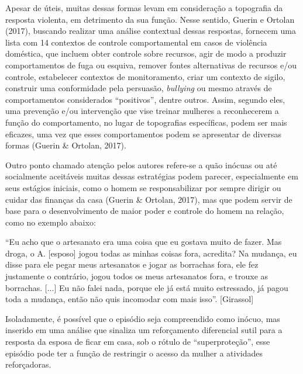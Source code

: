 Apesar de úteis, muitas dessas formas levam em consideração a topografia da resposta violenta, em detrimento da sua função. Nesse sentido, Guerin e Ortolan (2017), buscando realizar uma análise contextual dessas respostas, fornecem uma lista com 14 contextos de controle comportamental em casos de violência doméstica, que incluem obter controle sobre recursos, agir de modo a produzir comportamentos de fuga ou esquiva, remover fontes alternativas de recursos e/ou controle, estabelecer contextos de monitoramento, criar um contexto de sigilo, construir uma conformidade pela persuasão, \textit{bullying} ou mesmo através de comportamentos considerados ``positivos'', dentre outros. Assim, segundo eles, uma prevenção e/ou intervenção que vise treinar mulheres a reconhecerem a função do comportamento, no lugar de topografias específicas, podem ser mais eficazes, uma vez que esses comportamentos podem se apresentar de diversas formas (Guerin \& Ortolan, 2017).

Outro ponto chamado atenção pelos autores refere-se a quão inócuas ou até socialmente aceitáveis muitas dessas estratégias podem parecer, especialmente em seus estágios iniciais, como o homem se responsabilizar por sempre dirigir ou cuidar das finanças da casa (Guerin \& Ortolan, 2017), mas que podem servir de base para o desenvolvimento de maior poder e controle do homem na relação, como no exemplo abaixo:

``Eu acho que o artesanato era uma coisa que eu gostava muito de fazer. Mas droga, o A. [esposo] jogou todas as minhas coisas fora, acredita? Na mudança, eu disse para ele pegar meus artesanatos e jogar as borrachas fora, ele fez justamente o contrário, jogou todos os meus artesanatos fora, e trouxe as borrachas. [...] Eu não falei nada, porque ele já está muito estressado, já pagou toda a mudança, então não quis incomodar com mais isso''. [Girassol]

Isoladamente, é possível que o episódio seja compreendido como inócuo, mas inserido em uma análise que sinaliza um reforçamento diferencial sutil para a resposta da esposa de ficar em casa, sob o rótulo de ``superproteção'', esse episódio pode ter a função de restringir o acesso da mulher a atividades reforçadoras.

